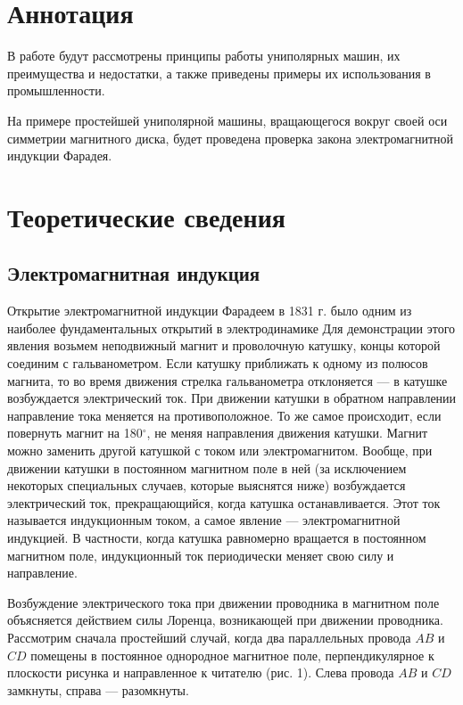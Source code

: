  
\usepackage{mathrsfs}
\usepackage[e]{esvect}
\usepackage{mathabx}
\newcommand{\dive}{\mathrm{div}}
\newcommand{\rot}{\mathrm{rot}}


\section{Аннотация}
В работе будут рассмотрены принципы работы
униполярных машин, их преимущества и
недостатки, а также приведены примеры их
использования в промышленности.

На примере простейшей униполярной
машины, вращающегося вокруг своей оси
симметрии магнитного диска, будет
проведена проверка закона
электромагнитной индукции Фарадея.

\section {Теоретические сведения}
\subsection{Электромагнитная индукция}

Открытие электромагнитной индукции
Фарадеем в 1831 г. было одним из
наиболее фундаментальных открытий в
электродинамике Для демонстрации этого
явления возьмем неподвижный магнит и
проволочную катушку, концы которой
соединим с гальванометром. Если катушку
приближать к одному из полюсов магнита,
то во время движения стрелка
гальванометра отклоняется — в катушке
возбуждается электрический ток. При
движении катушки в обратном направлении
направление тока меняется на
противоположное. То же самое происходит,
если повернуть магнит на 180$^\circ$, не меняя
направления движения катушки. Магнит
можно заменить другой катушкой с током
или электромагнитом. Вообще, при
движении катушки в постоянном магнитном
поле в ней (за исключением некоторых
специальных случаев, которые выяснятся
ниже) возбуждается электрический ток,
прекращающийся, когда катушка
останавливается. Этот ток называется
индукционным током, а самое явление —
электромагнитной индукцией. В
частности, когда катушка равномерно
вращается в постоянном магнитном поле,
индукционный ток периодически меняет
свою силу и направление.

Возбуждение электрического тока при
движении проводника в магнитном поле
объясняется действием силы Лоренца,
возникающей при движении проводника.
Рассмотрим сначала простейший случай,
когда два параллельных провода $AB$ и
$CD$  
помещены в постоянное однородное
магнитное поле, перпендикулярное к
плоскости рисунка и направленное к
читателю (рис. 1). Слева провода $AB$ и
$CD$ замкнуты, справа — разомкнуты. 

